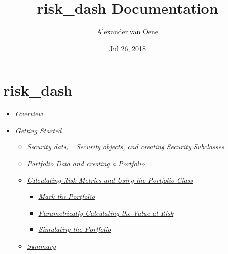 \documentclass[letterpaper,10pt,english]{sphinxmanual}
\title{risk\_dash Documentation}
\date{Jul 26, 2018}
\author{Alexander van Oene}
\begin{document}
\maketitle
\sphinxtableofcontents
{}\label{\detokenize{index::doc}}

\label{\detokenize{gettingstarted:gettingstarted}}

\chapter{risk\_dash}
\label{\detokenize{gettingstarted:risk-dash}}\label{\detokenize{gettingstarted::doc}}\begin{itemize}
\item {} 
{\hyperref[\detokenize{gettingstarted:overview}]{\emph{Overview}}}

\item {} 
{\hyperref[\detokenize{gettingstarted:getting-started}]{\emph{Getting Started}}}
\begin{itemize}
\item {} 
{\hyperref[\detokenize{gettingstarted:security-data-security-objects-and-creating-security-subclasses}]{\emph{Security data, \_Security objects, and creating Security
Subclasses}}}

\item {} 
{\hyperref[\detokenize{gettingstarted:portfolio-data-and-creating-a-portfolio}]{\emph{Portfolio Data and creating a
Portfolio}}}

\item {} 
{\hyperref[\detokenize{gettingstarted:calculating-risk-metrics-and-using-the-portfolio-class}]{\emph{Calculating Risk Metrics and Using the Portfolio
Class}}}
\begin{itemize}
\item {} 
{\hyperref[\detokenize{gettingstarted:mark-the-portfolio}]{\emph{Mark the Portfolio}}}

\item {} 
{\hyperref[\detokenize{gettingstarted:parametrically-calculating-the-value-at-risk}]{\emph{Parametrically Calculating the Value at
Risk}}}

\item {} 
{\hyperref[\detokenize{gettingstarted:simulating-the-portfolio}]{\emph{Simulating the Portfolio}}}

\end{itemize}

\item {} 
{\hyperref[\detokenize{gettingstarted:summary}]{\emph{Summary}}}

\end{itemize}

\end{itemize}
\end{document}
